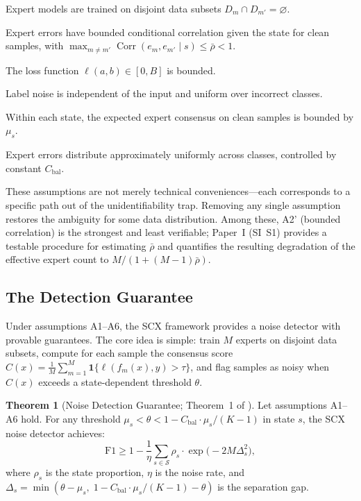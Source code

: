 \documentclass[twocolumn]{article}
\theoremstyle{definition}
\newtheorem{theorem}{Theorem}
\begin{document}
\begin{description}[nosep,leftmargin=*,style=nextline]
  \item[A1 (Disjoint training)] Expert models are trained on disjoint data subsets $D_m \cap D_{m'} = \varnothing$.
  \item[A2' (Bounded correlation)] Expert errors have bounded conditional correlation given the state for clean samples, with $\max_{m\neq m'}\operatorname{Corr}(e_m,e_{m'}\mid s) \leq \bar{\rho} < 1$.
  \item[A3 (Bounded loss)] The loss function $\ell(a,b) \in [0, B]$ is bounded.
  \item[A4 (Uniform noise)] Label noise is independent of the input and uniform over incorrect classes.
  \item[A5 (State homogeneity)] Within each state, the expected expert consensus on clean samples is bounded by $\mu_s$.
  \item[A6 (Balanced errors)] Expert errors distribute approximately uniformly across classes, controlled by constant $C_{\text{bal}}$.
\end{description}

These assumptions are not merely technical conveniences---each corresponds to a specific path out of the unidentifiability trap. Removing any single assumption restores the ambiguity for some data distribution. Among these, A2' (bounded correlation) is the strongest and least verifiable; Paper~I (SI~S1) provides a testable procedure for estimating $\bar{\rho}$ and quantifies the resulting degradation of the effective expert count to $M/(1+(M-1)\bar{\rho})$.

\subsection{The Detection Guarantee}

Under assumptions A1--A6, the SCX framework provides a noise detector with provable guarantees. The core idea is simple: train $M$ experts on disjoint data subsets, compute for each sample the consensus score $C(x) = \frac{1}{M}\sum_{m=1}^M \mathbf{1}\{\ell(f_m(x), y) > \tau\}$, and flag samples as noisy when $C(x)$ exceeds a state-dependent threshold $\theta$.

\begin{theorem}[Noise Detection Guarantee; Theorem~1 of \cite{paperI}]
\label{thm:detection}
Let assumptions A1--A6 hold. For any threshold $\mu_s < \theta < 1 - C_{\text{bal}}\cdot\mu_s/(K-1)$ in state $s$, the SCX noise detector achieves:
\begin{equation}
\mathrm{F1} \geq 1 - \frac{1}{\eta}\sum_{s\in\mathcal{S}} \rho_s \cdot \exp\bigl(-2M\Delta_s^2\bigr),
\label{eq:thm1}
\end{equation}
where $\rho_s$ is the state proportion, $\eta$ is the noise rate, and $\Delta_s = \min(\theta - \mu_s,\; 1 - C_{\text{bal}}\cdot\mu_s/(K-1) - \theta)$ is the separation gap.
\end{theorem}
\end{document}
